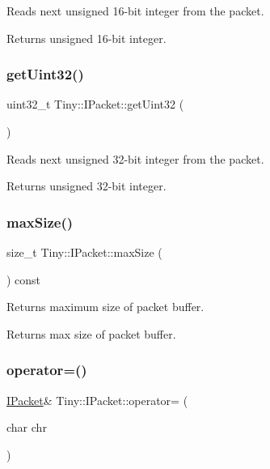 Reads next unsigned 16-\/bit integer from the packet. \begin{DoxyReturn}{Returns}
unsigned 16-\/bit integer. 
\end{DoxyReturn}
\mbox{\label{classTiny_1_1IPacket_a0a0d3758ca0f61e3eee9d20a7142de8d}} 
\subsubsection{\texorpdfstring{get\+Uint32()}{getUint32()}}
{\footnotesize\ttfamily uint32\+\_\+t Tiny\+::\+I\+Packet\+::get\+Uint32 (\begin{DoxyParamCaption}{ }\end{DoxyParamCaption})\hspace{0.3cm}{\ttfamily [inline]}}

Reads next unsigned 32-\/bit integer from the packet. \begin{DoxyReturn}{Returns}
unsigned 32-\/bit integer. 
\end{DoxyReturn}
\mbox{\label{classTiny_1_1IPacket_a0a448d8efe2b6db3ee826f23b184b395}} 
\subsubsection{\texorpdfstring{max\+Size()}{maxSize()}}
{\footnotesize\ttfamily size\+\_\+t Tiny\+::\+I\+Packet\+::max\+Size (\begin{DoxyParamCaption}{ }\end{DoxyParamCaption}) const\hspace{0.3cm}{\ttfamily [inline]}}

Returns maximum size of packet buffer. \begin{DoxyReturn}{Returns}
max size of packet buffer. 
\end{DoxyReturn}
\mbox{\label{classTiny_1_1IPacket_a215a30775140c2977b7064c91eada17e}} 
\subsubsection{\texorpdfstring{operator=()}{operator=()}}
{\footnotesize\ttfamily \hyperlink{classTiny_1_1IPacket}{I\+Packet}\& Tiny\+::\+I\+Packet\+::operator= (\begin{DoxyParamCaption}\item[{char}]{chr }\end{DoxyParamCaption})\hspace{0.3cm}{\ttfamily [inline]}}

